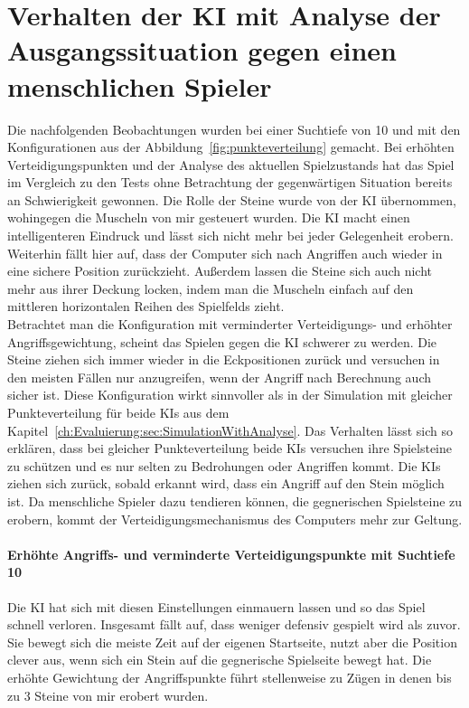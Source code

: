 \section{Verhalten der KI mit Analyse der Ausgangssituation gegen einen menschlichen Spieler}
\label{ch:Evaluierung:sec:KIvsHumanWithAnalyse}
Die nachfolgenden Beobachtungen wurden bei einer Suchtiefe von 10 und mit den Konfigurationen aus der Abbildung~\ref{fig:punkteverteilung} gemacht. Bei erhöhten Verteidigungspunkten und der Analyse des aktuellen Spielzustands hat das Spiel im Vergleich zu den Tests ohne Betrachtung der gegenwärtigen Situation bereits an Schwierigkeit gewonnen. Die Rolle der Steine wurde von der KI übernommen, wohingegen die Muscheln von mir gesteuert wurden. Die KI macht einen intelligenteren Eindruck und lässt sich nicht mehr bei jeder Gelegenheit erobern. Weiterhin fällt hier auf, dass der Computer sich nach Angriffen auch wieder in eine sichere Position zurückzieht. Außerdem lassen die Steine sich auch nicht mehr aus ihrer Deckung locken, indem man die Muscheln einfach auf den mittleren horizontalen Reihen des Spielfelds zieht.\\
Betrachtet man die Konfiguration mit verminderter Verteidigungs- und erhöhter Angriffsgewichtung, scheint das Spielen gegen die KI schwerer zu werden. Die Steine ziehen sich immer wieder in die Eckpositionen zurück und versuchen in den meisten Fällen nur anzugreifen, wenn der Angriff nach Berechnung auch sicher ist. Diese Konfiguration wirkt sinnvoller als in der Simulation mit gleicher Punkteverteilung für beide KIs aus dem Kapitel~\ref{ch:Evaluierung:sec:SimulationWithAnalyse}. Das Verhalten lässt sich so erklären, dass bei gleicher Punkteverteilung beide KIs versuchen ihre Spielsteine zu schützen und es nur selten zu Bedrohungen oder Angriffen kommt. Die KIs ziehen sich zurück, sobald erkannt wird, dass ein Angriff auf den Stein möglich ist. Da menschliche Spieler dazu tendieren können, die gegnerischen Spielsteine zu erobern, kommt der Verteidigungsmechanismus des Computers mehr zur Geltung.


\paragraph{Erhöhte Angriffs- und verminderte Verteidigungspunkte mit Suchtiefe 10}
Die KI hat sich mit diesen Einstellungen einmauern lassen und so das Spiel schnell verloren. Insgesamt fällt auf, dass weniger defensiv gespielt wird als zuvor. Sie bewegt sich die meiste Zeit auf der eigenen Startseite, nutzt aber die Position clever aus, wenn sich ein Stein auf die gegnerische Spielseite bewegt hat. Die erhöhte Gewichtung der Angriffspunkte führt stellenweise zu Zügen in denen bis zu 3 Steine von mir erobert wurden.
